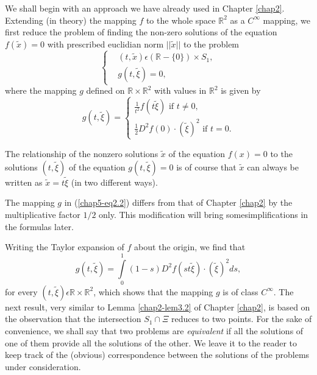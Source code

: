 We shall begin with an approach we have already used in Chapter
\ref{chap2}. Extending (in theory) the mapping $f$ to the whole space
$\mathbb{R}^{2}$ as a $C^{\infty}$ mapping, we first reduce the
problem of finding the non-zero solutions of the equation
$f(\widetilde{x}) = 0$ with prescribed euclidian norm
$||\widetilde{x}||$ to the problem
\begin{equation*}
\begin{cases}
& (t, \widetilde{x}) \epsilon (\mathbb{R} - \{0\}) \times S_{1},\\
& g(t, \widetilde{\xi}) = 0,
\end{cases}\tag{2.1}\label{chap5-eq2.1}
\end{equation*}
where the mapping $g$ defined on $\mathbb{R} \times \mathbb{R}^{2}$ with
values in $\mathbb{R}^{2}$ is given by
\begin{equation*}
g(t, \widetilde{\xi}) = 
\begin{cases}
\frac{1}{t^{2}} f(t\widetilde{\xi}) \text{ if } t \neq 0,\\
\frac{1}{2} D^{2}f(0) \cdot (\widetilde{\xi})^{2} \text{ if } t =
0.
\end{cases}\tag{2.2}\label{chap5-eq2.2} 
\end{equation*}

The relationship of the nonzero solutions $\widetilde{x}$ of the
equation $f(x) = 0$ to the solutions $(t, \widetilde{\xi})$ of the
equation $g(t, \widetilde{\xi}) = 0$ is of course that $\widetilde{x}$
can always be written as $\widetilde{x} = t\widetilde{\xi}$ (in two
different ways).

\begin{remark}\label{chap5-rem2.1}
The mapping $g$ in (\ref{chap5-eq2.2}) differs from that of Chapter
\ref{chap2} by the multiplicative factor $1/2$ only. This modification
will bring some\pageoriginale simplifications in the formulas later.
\end{remark}

Writing the Taylor expansion of $f$ about the origin, we find that 
\begin{equation*}
g(t, \widetilde{\xi}) = \int\limits_{0}^{1} (1-s)
D^{2}f(st\widetilde{\xi}) \cdot (\widetilde{\xi})^{2} ds,\tag{2.3}\label{chap5-eq2.3}
\end{equation*}
for every $(t, \widetilde{\xi}) \epsilon \mathbb{R} \times
\mathbb{R}^{2}$, which shows that the mapping $g$ is of class
$C^{\infty}$. The next result, very similar to Lemma
\ref{chap2-lem3.2} of Chapter \ref{chap2}, is based on the observation
that the intersection $S_{1} \cap \Xi$ reduces to two points. For the
sake of convenience, we shall say that two problems are {\em
  equivalent} if all the solutions of one of them provide all the
solutions of the other. We leave it to the reader to keep track of the
(obvious) correspondence between the solutions of the problems under
consideration.

